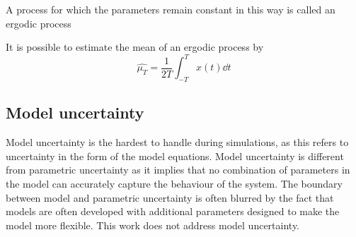 A process for which the parameters remain constant in this way is called an ergodic process

It is possible to estimate the mean of an ergodic process by 
\begin{equation}
  \hat{\mu_T} = \frac{1}{2T} \int_{-T}^{T} x(t) \dd t
\end{equation}


\subsection{Model uncertainty}
Model uncertainty is the hardest to handle during simulations, as this refers to uncertainty in the form of the model equations.  
Model uncertainty is different from parametric uncertainty as it implies that no combination of parameters in the model can accurately capture the behaviour of the system.  
The boundary between model and parametric uncertainty is often blurred by the fact that models are often developed with additional parameters designed to make the model more flexible.  
This work does not address model uncertainty.


